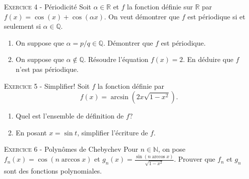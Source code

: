 

\vskip0.3cm\noindent\textsc{Exercice 4} - Périodicité
\vskip0.2cm
Soit $\alpha\in\mathbb R$ et $f$ la fonction définie sur $\mathbb R$ par $f(x)=\cos(x)+\cos(\alpha x)$. On veut démontrer que $f$ est périodique si et seulement si $\alpha\in\mathbb Q$.
\begin{enumerate}
\item On suppose que $\alpha=p/q\in\mathbb Q$. Démontrer que $f$ est périodique.
\item On suppose que $\alpha\notin\mathbb Q$. Résoudre l'équation $f(x)=2$. En déduire que $f$ n'est pas périodique.
\end{enumerate}




\vskip0.3cm\noindent\textsc{Exercice 5} - Simplifier!
\vskip0.2cm
Soit $f$ la fonction définie par 
$$f(x)=\arcsin\left(2x\sqrt{1-x^2}\right).$$
\begin{enumerate}
\item Quel est l'ensemble de définition de $f$?
\item En posant $x=\sin t$, simplifier l'écriture de $f$.
\end{enumerate}




\vskip0.3cm\noindent\textsc{Exercice 6} - Polynômes de Chebychev
\vskip0.2cm
Pour $n\in\mathbb N$, on pose $f_n(x)=\cos(n\arccos x)$ et $g_n(x)=\frac{\sin(n \arccos x)}{\sqrt{1-x^2}}$.
Prouver que $f_n$ et $g_n$ sont des fonctions polynomiales.




\vskip0.5cm

